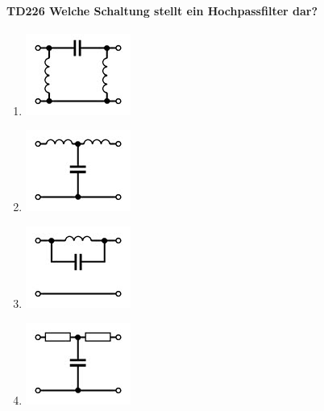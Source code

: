 \documentclass[8pt]{article}
\begin{document}
\begin{enumerate}
\begin{enumerate}[nolistsep,label=\Alph*]
{\paragraph*{TD226 Welche Schaltung stellt ein Hochpassfilter dar?}
\begin{enumerate}[nolistsep,label=\Alph*]
\item
\begin{center}
	\begin{minipage}{\linewidth}
		\centering
		\includegraphics[scale=1.0]{pics/td226_a.jpg}
	\end{minipage}
\end{center}
\item
\begin{center}
	\begin{minipage}{\linewidth}
		\centering
		\includegraphics[scale=1.0]{pics/td226_b.jpg}
	\end{minipage}
\end{center}
\item
\begin{center}
	\begin{minipage}{\linewidth}
		\centering
		\includegraphics[scale=1.0]{pics/td226_c.jpg}
	\end{minipage}
\end{center}
\item
\begin{center}
	\begin{minipage}{\linewidth}
		\centering
		\includegraphics[scale=1.0]{pics/td226_d.jpg}
	\end{minipage}
\end{center}
\end{enumerate}

}
\end{enumerate}
\end{enumerate}
\end{document}
